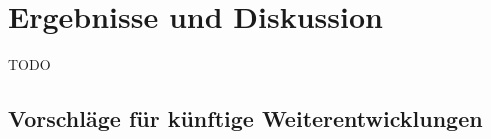 \chapter{Ergebnisse und Diskussion}
\label{cha:ergebnisse}
TODO

\section{Vorschläge für künftige Weiterentwicklungen}
